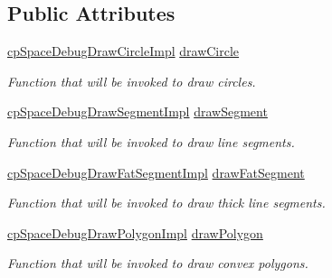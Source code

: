 \subsection*{Public Attributes}
\begin{DoxyCompactItemize}
\item 
\mbox{\label{structcpSpaceDebugDrawOptions_af028efdb04af469d2d82747b3507f948}} 
\hyperlink{group__cpSpace_gab96ab3199114538fa70cb5f7c6b2887a}{cp\+Space\+Debug\+Draw\+Circle\+Impl} \hyperlink{structcpSpaceDebugDrawOptions_af028efdb04af469d2d82747b3507f948}{draw\+Circle}
\begin{DoxyCompactList}\small\item\em Function that will be invoked to draw circles. \end{DoxyCompactList}\item 
\mbox{\label{structcpSpaceDebugDrawOptions_aa5b88eb81bc797b53380dbdaf62e9379}} 
\hyperlink{group__cpSpace_gaed387c6356be81f3da4050547fe47c9e}{cp\+Space\+Debug\+Draw\+Segment\+Impl} \hyperlink{structcpSpaceDebugDrawOptions_aa5b88eb81bc797b53380dbdaf62e9379}{draw\+Segment}
\begin{DoxyCompactList}\small\item\em Function that will be invoked to draw line segments. \end{DoxyCompactList}\item 
\mbox{\label{structcpSpaceDebugDrawOptions_af5dbe4ef11222dac6ecad0d44ea1ed94}} 
\hyperlink{group__cpSpace_gab8b2b1f7036daa38914a0d3c2cb1d732}{cp\+Space\+Debug\+Draw\+Fat\+Segment\+Impl} \hyperlink{structcpSpaceDebugDrawOptions_af5dbe4ef11222dac6ecad0d44ea1ed94}{draw\+Fat\+Segment}
\begin{DoxyCompactList}\small\item\em Function that will be invoked to draw thick line segments. \end{DoxyCompactList}\item 
\mbox{\label{structcpSpaceDebugDrawOptions_a7636181e25205596933451c09e709239}} 
\hyperlink{group__cpSpace_ga2138e846816a1e581a3433740a596ab6}{cp\+Space\+Debug\+Draw\+Polygon\+Impl} \hyperlink{structcpSpaceDebugDrawOptions_a7636181e25205596933451c09e709239}{draw\+Polygon}
\begin{DoxyCompactList}\small\item\em Function that will be invoked to draw convex polygons. \end{DoxyCompactList}\item 

\end{DoxyCompactItemize}
